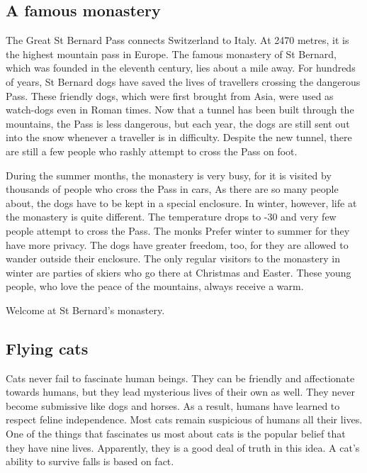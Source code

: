 \documentclass[11pt]{article}
\begin{document}
\subsection{A famous monastery}
\label{sec-1-8}

The Great St Bernard Pass connects Switzerland to Italy. At 2470 metres, it is the highest mountain pass in Europe. The famous monastery of St Bernard, which was founded in the eleventh century, lies about a mile away. For hundreds of years, St Bernard dogs have saved the lives of travellers crossing the dangerous Pass. These friendly dogs, which were first brought from Asia, were used as watch-dogs even in Roman times. Now that a tunnel has been built through the mountains, the Pass is less dangerous, but each year, the dogs are still sent out into the snow whenever a traveller is in difficulty. Despite the new tunnel, there are still a few people who rashly attempt to cross the Pass on foot.

During the summer months, the monastery is very busy, for it is visited by thousands of people who cross the Pass in cars, As there are so many people about, the dogs have to be kept in a special enclosure. In winter, however, life at the monastery is quite different. The temperature drops to -30 and very few people attempt to cross the Pass. The monks Prefer winter to summer for they have more privacy. The dogs have greater freedom, too, for they are allowed to wander outside their enclosure. The only regular visitors to the monastery in winter are parties of skiers who go there at Christmas and Easter. These young people, who love the peace of the mountains, always receive a warm.

Welcome at St Bernard's monastery.
\subsection{Flying cats}
\label{sec-1-9}

Cats never fail to fascinate human beings. They can be friendly and affectionate towards humans, but they lead mysterious lives of their own as well. They never become submissive like dogs and horses. As a result, humans have learned to respect feline independence. Most cats remain suspicious of humans all their lives. One of the things that fascinates us most about cats is the popular belief that they have nine lives. Apparently, they is a good deal of truth in this idea. A cat's ability to survive falls is based on fact.
\end{document}
